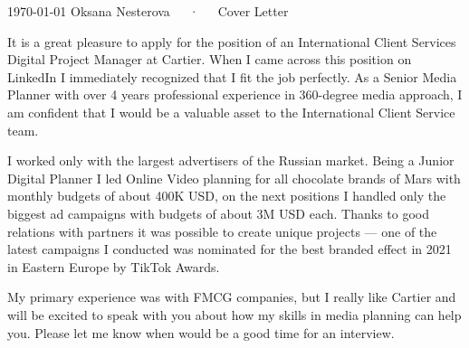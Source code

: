 \documentclass[11pt, a4paper]{awesome-cv}
\begin{document}
\makecvheader[R]

\makecvfooter
  {\today}
  {Oksana Nesterova~~~·~~~Cover Letter}
  {}

\makelettertitle

\begin{cvletter}

It is a great pleasure to apply for the position of an International Client Services Digital Project Manager at Cartier. When I came across this position on LinkedIn I immediately recognized that I fit the job perfectly. As a Senior Media Planner with over 4 years professional experience in 360-degree media approach, I am confident that I would be a valuable asset to the International Client Service team.

I worked only with the largest advertisers of the Russian market. Being a Junior Digital Planner I led Online Video planning for all chocolate brands of Mars with monthly budgets of about 400K USD, on the next positions I handled only the biggest ad campaigns with budgets of about 3M USD each. Thanks to good relations with partners it was possible to create unique projects --- one of the latest campaigns I conducted was nominated for the best branded effect in 2021 in Eastern Europe by TikTok Awards.


My primary experience was with FMCG companies, but I really like Cartier and will be excited to speak with you about how my skills in media planning can help you. Please let me know when would be a good time for an interview.


\end{cvletter}


\makeletterclosing
\end{document}
